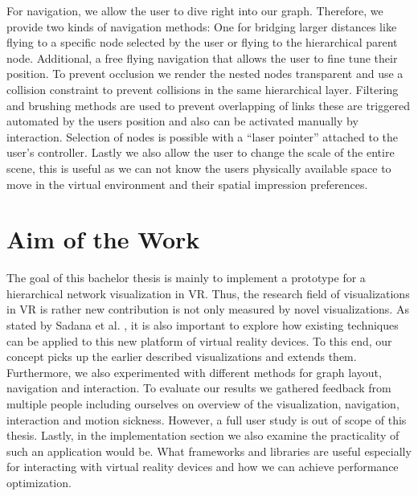 For navigation, we allow the user to dive right into our graph. Therefore, we provide two kinds of navigation methods: One for bridging larger distances like flying to a specific node selected by the user or flying to the hierarchical parent node. Additional, a free flying navigation that allows the user to fine tune their position. To prevent occlusion we render the nested nodes transparent and use a collision constraint to prevent collisions in the same hierarchical layer. Filtering and brushing methods are used to prevent overlapping of links these are triggered automated by the users position and also can be activated manually by interaction. Selection of nodes is possible with a “laser pointer” attached to the user's controller. Lastly we also allow the user to change the scale of the entire scene, this is useful as we can not know the users physically available space to move in the virtual environment and their spatial impression preferences. 


\section{Aim of the Work}

The goal of this bachelor thesis is mainly to implement a prototype for a hierarchical network visualization in VR. Thus, the research field of visualizations in VR is rather new contribution is not only measured by novel visualizations. As stated by Sadana et al. \cite{sadana_redefining_2016}, it is also important to explore how existing techniques can be applied to this new platform of virtual reality devices. To this end, our concept picks up the earlier described visualizations and extends them. Furthermore, we also experimented with different methods for graph layout, navigation and interaction. To evaluate our results we gathered feedback from multiple people including ourselves on overview of the visualization, navigation, interaction and motion sickness. However, a full user study is out of scope of this thesis. Lastly, in the implementation section we also examine the practicality of such an application would be. What frameworks and libraries are useful especially for interacting with virtual reality devices and how we can achieve performance optimization. 
